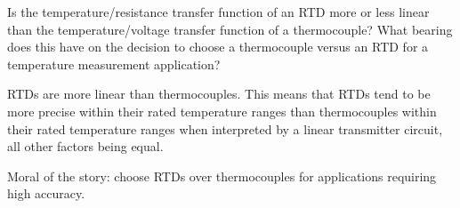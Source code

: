 

Is the temperature/resistance transfer function of an RTD more or less linear than the temperature/voltage transfer function of a thermocouple?  What bearing does this have on the decision to choose a thermocouple versus an RTD for a temperature measurement application?







RTDs are more linear than thermocouples.  This means that RTDs tend to be more precise within their rated temperature ranges than thermocouples within their rated temperature ranges when interpreted by a linear transmitter circuit, all other factors being equal. 







Moral of the story: choose RTDs over thermocouples for applications requiring high accuracy.




